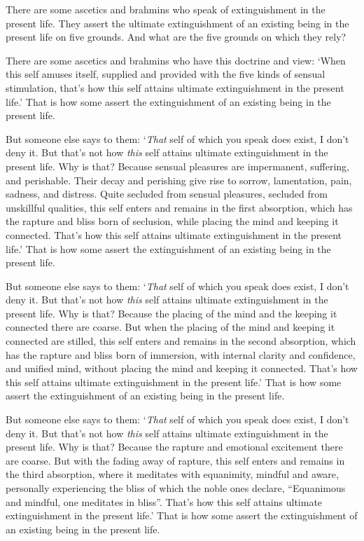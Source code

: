 \documentclass[12pt,openany]{book}%
\begin{document}
There are some ascetics and brahmins who speak of extinguishment in the present life. They assert the ultimate extinguishment of an existing being in the present life on five grounds. And what are the five grounds on which they rely? 

There are some ascetics and brahmins who have this doctrine and view: ‘When this self amuses itself, supplied and provided with the five kinds of sensual stimulation, that’s how this self attains ultimate extinguishment in the present life.’ That is how some assert the extinguishment of an existing being in the present life. 

But someone else says to them: ‘\emph{That} self of which you speak does exist, I don’t deny it. But that’s not how \emph{this} self attains ultimate extinguishment in the present life. Why is that? Because sensual pleasures are impermanent, suffering, and perishable. Their decay and perishing give rise to sorrow, lamentation, pain, sadness, and distress. Quite secluded from sensual pleasures, secluded from unskillful qualities, this self enters and remains in the first absorption, which has the rapture and bliss born of seclusion, while placing the mind and keeping it connected. That’s how this self attains ultimate extinguishment in the present life.’ That is how some assert the extinguishment of an existing being in the present life. 

But someone else says to them: ‘\emph{That} self of which you speak does exist, I don’t deny it. But that’s not how \emph{this} self attains ultimate extinguishment in the present life. Why is that? Because the placing of the mind and the keeping it connected there are coarse. But when the placing of the mind and keeping it connected are stilled, this self enters and remains in the second absorption, which has the rapture and bliss born of immersion, with internal clarity and confidence, and unified mind, without placing the mind and keeping it connected. That’s how this self attains ultimate extinguishment in the present life.’ That is how some assert the extinguishment of an existing being in the present life. 

But someone else says to them: ‘\emph{That} self of which you speak does exist, I don’t deny it. But that’s not how \emph{this} self attains ultimate extinguishment in the present life. Why is that? Because the rapture and emotional excitement there are coarse. But with the fading away of rapture, this self enters and remains in the third absorption, where it meditates with equanimity, mindful and aware, personally experiencing the bliss of which the noble ones declare, “Equanimous and mindful, one meditates in bliss”. That’s how this self attains ultimate extinguishment in the present life.’ That is how some assert the extinguishment of an existing being in the present life. 
\end{document}
